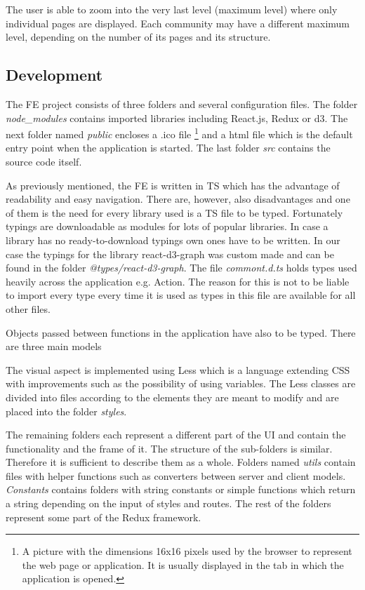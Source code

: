 The user is able to zoom into the very last level (maximum level) where only individual pages are displayed. Each community may have a different maximum level, depending on the number of its pages and its structure.

\subsection{Development}
The FE project consists of three folders and several configuration files. The folder \textit{node\_modules} contains imported libraries including React.js, Redux or d3. The next folder named \textit{public} encloses a .ico file \footnote {A picture with the dimensions 16x16 pixels used by the browser to represent the web page or application. It is usually displayed in the tab in which the application is opened.} and a html file which is the default entry point when the application is started. The last folder \textit{src} contains the source code itself. 

As previously mentioned, the FE is written in TS which has the advantage of readability and easy navigation. There are, however, also disadvantages and one of them is the need for every library used is a TS file to be typed. Fortunately typings are downloadable as modules for lots of popular libraries. In case a library has no ready-to-download typings own ones have to be written. In our case the typings for the library react-d3-graph was custom made and can be found in the folder \textit{@types/react-d3-graph}. The file \textit{commont.d.ts} holds types used heavily across the application e.g. Action. The reason for this is not to be liable to import every type every time it is used as types in this file are available for all other files. 

Objects passed between functions in the application have also to be typed. There are three main models

The visual aspect is implemented using Less \cite{less} which is a language extending CSS with improvements such as the possibility of using variables. The Less classes are divided into files according to the elements they are meant to modify and are placed into the folder \textit{styles}. 

The remaining folders each represent a different part of the UI and contain the functionality and the frame of it. The structure of the sub-folders is similar. Therefore it is sufficient to describe them as a whole. Folders named \textit{utils} contain files with helper functions such as converters between server and client models. \textit{Constants} contains folders with string constants or simple functions which return a string depending on the input  of styles and routes. The rest of the folders represent some part of the Redux framework. 

